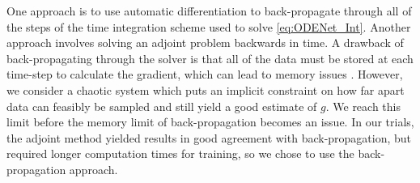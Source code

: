 \documentclass[preprint,aps,pre,letterpaper,onecolumn,superscriptaddress]{revtex4-2} %
\begin{document}
One approach is to use automatic differentiation to back-propagate through all of the steps of the time integration scheme used to solve \ref{eq:ODENet_Int}. Another approach involves solving an adjoint problem backwards in time. A drawback of back-propagating through the solver is that all of the data must be stored at each time-step to calculate the gradient, which can lead to memory issues \cite{Chen2019}. However, we consider a chaotic system which puts an implicit constraint on how far apart data can feasibly be sampled and still yield a good estimate of $g$. We reach this limit before the memory limit of back-propagation becomes an issue. In our trials, the adjoint method yielded results in good agreement with back-propagation, but required longer computation times for training, so we chose to use the back-propagation approach.


\end{document}
